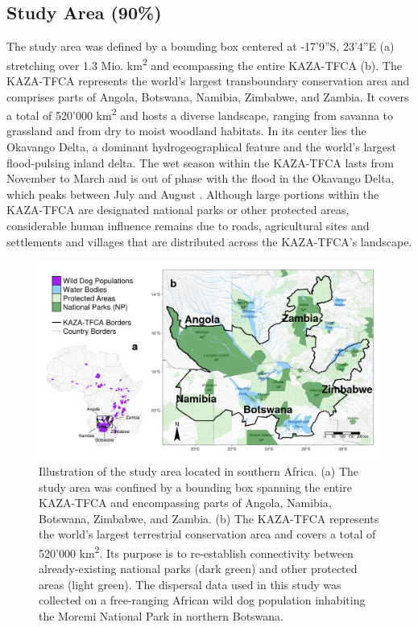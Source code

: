 \documentclass[abstract=on,10pt,a4paper,bibliography=totocnumbered]{article}
\begin{document}
\subsection{Study Area (90\%)}
The study area was defined by a bounding box centered at -17'9''S,
23'4''E (a) stretching over 1.3 Mio.
km\textsuperscript{2} and ecompassing the entire KAZA-TFCA (b).
The KAZA-TFCA represents the world's largest transboundary conservation area and
comprises parts of Angola, Botswana, Namibia, Zimbabwe, and Zambia. It covers a
total of 520'000 km\textsuperscript{2} and hosts a diverse landscape, ranging
from savanna to grassland and from dry to moist woodland habitats. In its center
lies the Okavango Delta, a dominant hydrogeographical feature and the world's
largest flood-pulsing inland delta. The wet season within the KAZA-TFCA lasts
from November to March and is out of phase with the flood in the Okavango Delta,
which peaks between July and August \citep{McNutt.1996, Wolski.2017}. Although
large portions within the KAZA-TFCA are designated national parks or other
protected areas, considerable human influence remains due to roads, agricultural
sites and settlements and villages that are distributed across the KAZA-TFCA's
landscape.

\begin{figure}[htbp]
  \begin{center}
    \includegraphics[width = \textwidth]{99_StudyArea.png}
    \caption{Illustration of the study area located in southern Africa. (a) The
    study area was confined by a bounding box spanning the entire KAZA-TFCA and
    encompassing parts of Angola, Namibia, Botswana, Zimbabwe, and Zambia. (b)
    The KAZA-TFCA represents the world's largest terrestrial conservation area
    and covers a total of 520'000 km\textsuperscript{2}. Its purpose is to
    re-establish connectivity between already-existing national parks (dark
    green) and other protected areas (light green). The dispersal data used in
    this study was collected on a free-ranging African wild dog population
    inhabiting the Moremi National Park in northern Botswana.}
    \label{StudyArea}
  \end{center}
\end{figure}
\end{document}
